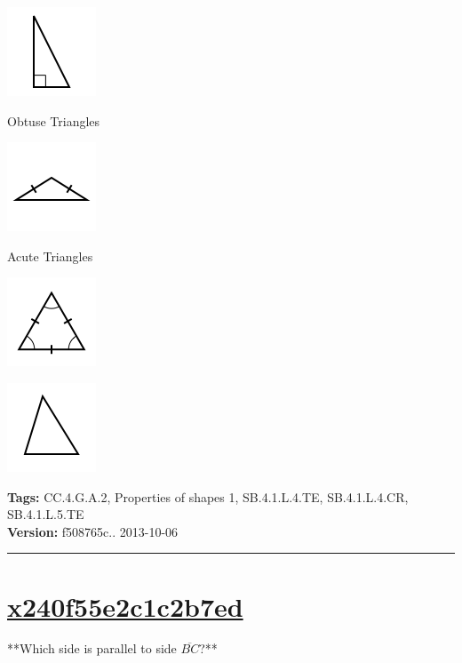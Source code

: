 \documentclass[twocolumn,10pt]{article}
\def\shrinkfactor{0.55}
\begin{document}
\includegraphics[scale=\shrinkfactor]{figures/ac56df552ee790942f862b76d637a69c2180f1d4.png}

Obtuse Triangles


\includegraphics[scale=\shrinkfactor]{figures/ab33a8ea9f6040b7277f725f46c6d9452ab8fbbc.png}

Acute Triangles


\includegraphics[scale=\shrinkfactor]{figures/2e6355867a1027528f1719f9dcb578dcb221b055.png}


\includegraphics[scale=\shrinkfactor]{figures/ee7f87a00acb47dec4f2b2eed9a6741b21afc47d.png}



\medskip
\noindent
\textbf{Tags:} {\footnotesize CC.4.G.A.2, Properties of shapes 1, SB.4.1.L.4.TE, SB.4.1.L.4.CR, SB.4.1.L.5.TE}\\
\textbf{Version:} f508765c.. 2013-10-06
\smallskip\hrule





\section{\href{https://www.khanacademy.org/devadmin/content/items/x240f55e2c1c2b7ed}{x240f55e2c1c2b7ed}}

\noindent
**Which side is parallel to side $\overline{BC}$?**
\end{document}
